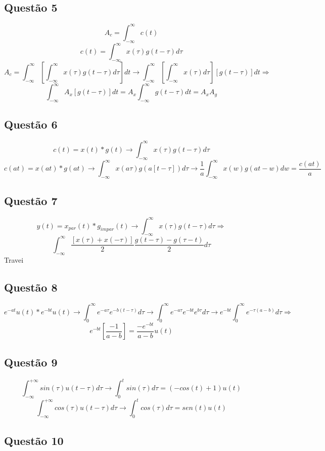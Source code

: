 \documentclass[a4paper, 12pt]{article}
\begin{document}
    \subsection{Quest\~{a}o 5}
    \[A_{c} = \int_{-\infty}^{\infty} c(t)\]
    \[c(t) = \int_{-\infty}^{\infty} x(\tau)g(t -\tau)d\tau\]
    \[A_{c} = \int_{-\infty}^{\infty} [\int_{-\infty}^{\infty} x(\tau)g(t -\tau)d\tau] dt \rightarrow \int_{-\infty}^{\infty} [\int_{-\infty}^{\infty} x(\tau)d\tau][g(t -\tau)] dt \Rightarrow\]
    \[\int_{-\infty}^{\infty} A_{x}[g(t -\tau)] dt = A_{x}\int_{-\infty}^{\infty}g(t -\tau)dt = A_{x}A_{g} \]
    
    \subsection{Quest\~{a}o 6}
    \[c(t) = x(t)\ast g(t) \rightarrow \int_{-\infty}^{\infty} x(\tau)g(t -\tau)d\tau\]
    \[c(at) = x(at)\ast g(at) \rightarrow \int_{-\infty}^{\infty} x(a\tau)g(a[t - \tau])d\tau \rightarrow \frac{1}{a}\int_{-\infty}^{\infty} x(w)g(at - w)dw = \frac{c(at)}{a}\]
    \subsection{Quest\~{a}o 7} 
    \[y(t) = x_{par}(t)\ast g_{impar}(t) \rightarrow \int_{-\infty}^{\infty} x(\tau)g(t -\tau)d\tau \Rightarrow\]
    \[\int_{-\infty}^{\infty} \frac{[x(\tau) + x(-\tau)]}{2}\frac{g(t -\tau) - g(\tau - t)}{2}d\tau\]    
    Travei
    \subsection{Quest\~{a}o 8}
    \[ e^{-at}u(t)\ast e^{-bt}u(t) \rightarrow \int_{0}^{\infty} e^{-a\tau}e^{-b(t-\tau)}d\tau \rightarrow \int_{0}^{\infty} e^{-a\tau}e^{-bt}e^{b\tau}d\tau \rightarrow e^{-bt}\int_{0}^{\infty} e^{-\tau(a-b)}d\tau \Rightarrow\]
    \[ e^{-bt}[\frac{-1}{a-b}] = \frac{-e^{-bt}}{a-b}u(t)\]
    \subsection{Quest\~{a}o 9}
    \[ \int_{-\infty}^{+\infty} sin(\tau)u(t-\tau) d\tau \rightarrow \int_{0}^{t} sin(\tau) d\tau = (-cos(t) + 1)u(t)\]    
    \[ \int_{-\infty}^{+\infty} cos(\tau)u(t-\tau) d\tau \rightarrow \int_{0}^{t} cos(\tau) d\tau = sen(t)u(t)\]       
    \subsection{Quest\~{a}o 10}
\end{document}
